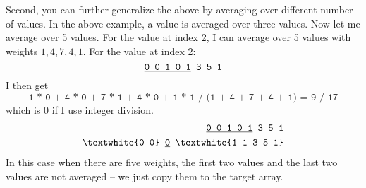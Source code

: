 Second, you can further generalize the above by averaging over different number
of values.
In the above example, a value is averaged over three values.
Now let me average over 5 values.
For the value at index 2, I can average over 5 values with weights
$1,4,7,4,1$.
For the value at index 2:
\[
\texttt{\underline{0 0 1 0 1} 3 5 1}
\]
I then get
\[
\texttt{1 * 0 + 4 * 0 + 7 * 1 + 4 * 0 + 1 * 1 / (1 + 4 + 7 + 4 + 1)
= 9 / 17}
\]
which is 0 if I use integer division.
\begin{align*}
\texttt{\underline{0 0 1 0 1} 3 5 1} & \\
\texttt{\textwhite{0 0} \underline{0} \textwhite{1 1 3 5 1}} &
\end{align*}
In this case when there are five weights, the first two values
and the last two values are not averaged -- we just copy them to the
target array.

